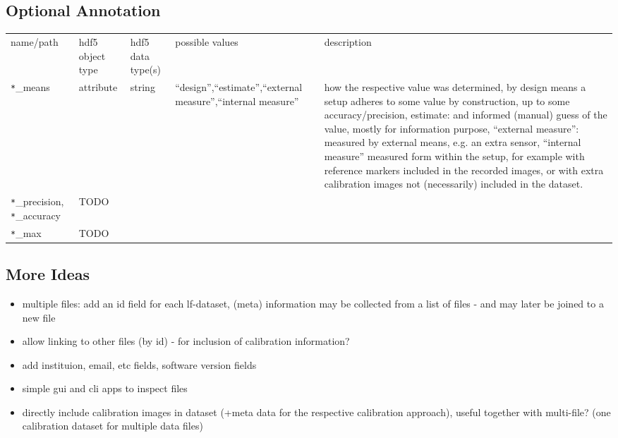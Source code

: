 \documentclass[a4paper,10pt]{article}
\begin{document}
\begin{landscape}
\subsection{Optional Annotation}
\noindent
\begin{tabularx}{\linewidth}{llllX}
name/path                          & hdf5 object type & hdf5 data type(s) & possible values & description \\
\verb|*|\_means           & attribute & string & ``design'',``estimate'',``external measure'',``internal measure'' & how the respective value was determined, by design means a setup adheres to some value by construction, up to some accuracy/precision, estimate: and informed (manual) guess of the value, mostly for information purpose, ``external measure'': measured by external means, e.g. an extra sensor, ``internal measure'' measured form within the setup, for example with reference markers included in the recorded images, or with extra calibration images not (necessarily) included in the dataset. \\
\verb|*|\_precision, \verb|*|\_accuracy & TODO \\
\verb|*|\_max  & TODO \\
\end{tabularx}
\end{landscape}
\restoregeometry

\subsection{More Ideas}
\begin{itemize}
 \item multiple files: add an id field for each lf-dataset, (meta) information may be collected from a list of files - and may later be joined to a new file
 \item allow linking to other files (by id) - for inclusion of calibration information?
 \item add instituion, email, etc fields, software version fields
 \item simple gui and cli apps to inspect files
 \item directly include calibration images in dataset (+meta data for the respective calibration approach), useful together with multi-file? (one calibration dataset for multiple data files)
\end{itemize}
\end{document}
